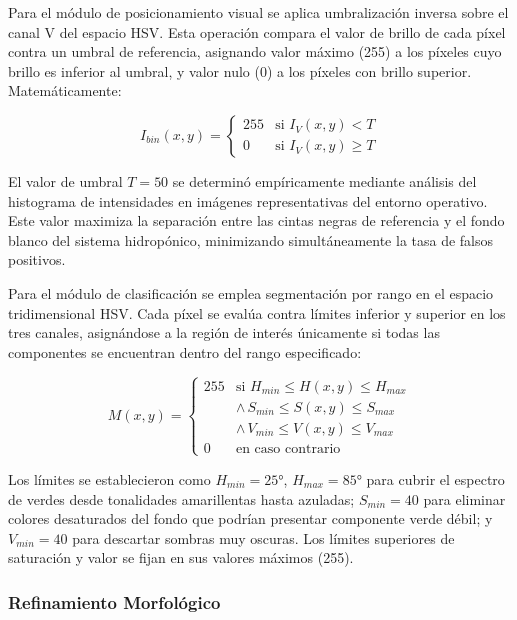 Para el módulo de posicionamiento visual se aplica umbralización inversa sobre el canal V del espacio HSV. Esta operación compara el valor de brillo de cada píxel contra un umbral de referencia, asignando valor máximo (255) a los píxeles cuyo brillo es inferior al umbral, y valor nulo (0) a los píxeles con brillo superior. Matemáticamente:

\begin{equation}
I_{bin}(x,y) = \begin{cases}
255 & \text{si } I_V(x,y) < T \\
0 & \text{si } I_V(x,y) \geq T
\end{cases}
\end{equation}

El valor de umbral $T = 50$ se determinó empíricamente mediante análisis del histograma de intensidades en imágenes representativas del entorno operativo. Este valor maximiza la separación entre las cintas negras de referencia y el fondo blanco del sistema hidropónico, minimizando simultáneamente la tasa de falsos positivos.

Para el módulo de clasificación se emplea segmentación por rango en el espacio tridimensional HSV. Cada píxel se evalúa contra límites inferior y superior en los tres canales, asignándose a la región de interés únicamente si todas las componentes se encuentran dentro del rango especificado:

\begin{equation}
M(x,y) = \begin{cases}
255 & \text{si } H_{min} \leq H(x,y) \leq H_{max} \\
& \land \, S_{min} \leq S(x,y) \leq S_{max} \\
& \land \, V_{min} \leq V(x,y) \leq V_{max} \\
0 & \text{en caso contrario}
\end{cases}
\end{equation}

Los límites se establecieron como $H_{min} = 25°$, $H_{max} = 85°$ para cubrir el espectro de verdes desde tonalidades amarillentas hasta azuladas; $S_{min} = 40$ para eliminar colores desaturados del fondo que podrían presentar componente verde débil; y $V_{min} = 40$ para descartar sombras muy oscuras. Los límites superiores de saturación y valor se fijan en sus valores máximos (255).

\subsubsection{Refinamiento Morfológico}

